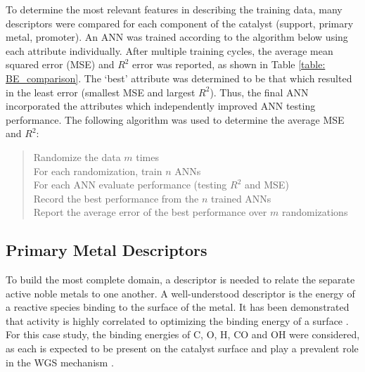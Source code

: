 To determine the most relevant features in describing the training data, many descriptors were compared for each component of the catalyst (support, primary metal, promoter). An ANN was trained according to the algorithm below using each attribute individually. After multiple training cycles, the average mean squared error (MSE) and $R^2$ error was reported, as shown in Table \ref{table: BE_comparison}. The `best' attribute was determined to be that which resulted in the least error (smallest MSE and largest $R^2$). Thus, the final ANN incorporated the attributes which independently improved ANN testing performance. The following algorithm was used to determine the average MSE and $R^2$: 

		\begin{quote}
		Randomize the data $m$ times\\
		For each randomization, train $n$ ANNs\\
		For each ANN evaluate performance (testing $R^2$ and MSE)\\
		Record the best performance from the $n$ trained ANNs\\
		Report the average error of the best performance over $m$ randomizations 
		\end{quote}

	\subsection{Primary Metal Descriptors}
	To build the most complete domain, a descriptor is needed to relate the separate active noble metals to one another. A well-understood descriptor is the energy of a reactive species binding to the surface of the metal. It has been demonstrated that activity is highly correlated to optimizing the binding energy of a surface \cite{Greeley_2016}. For this case study, the binding energies of C, O, H, CO and OH were considered, as each is expected to be present on the catalyst surface and play a prevalent role in the WGS mechanism \cite{Gokhale_2008}.

